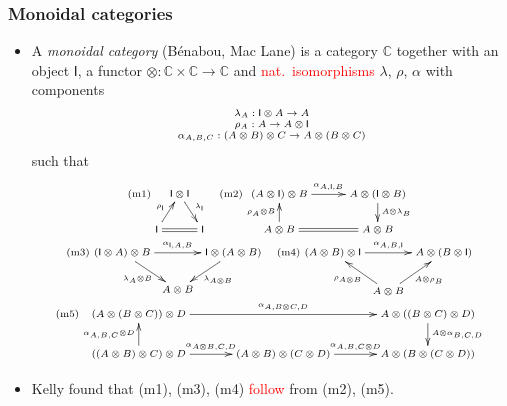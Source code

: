 \documentclass[10pt,t]{beamer}
\newcommand{\red}[1]{\textcolor{red}{#1}}
\newcommand{\I}{\mathsf{I}}
\newcommand{\ot}{\otimes}
\newcommand{\C}{\mathbb{C}}
\newcommand{\al}{\alpha}
\newcommand{\lam}{\lambda}
\begin{document}
\begin{frame}

\frametitle{Monoidal categories}

\begin{itemize}

\item A \emph{monoidal category} (B\'enabou, Mac Lane) is a category $\C$
  together with an object $\I$, a functor $\ot : \C \times \C \to \C$
  and \red{nat.\ isomorphisms} $\lam$, $\rho$, $\al$ with components
\[
\scriptsize
\begin{array}{c}
\lam_{A} : \I \ot A \to A \\
\rho_{A} : A \to A \ot \I\\
\al_{A,B,C} : (A \ot B) \ot C \to A \ot (B \ot C)
\end{array}
\]
such that
\[
\scriptsize
\begin{array}{c}
\mathrm{(m1)}
\xymatrix@R=1.2pc@C=0.2pc{
    & \I \ot \I \ar[dr]^-{\lambda_\I} & \\
    \I \ar[ur]^-{\rho_\I} \ar@{=}[rr] & & \I
    }
\quad
\mathrm{(m2)}
\xymatrix@R=1.1pc{
      (A\ot \I) \ot B \ar[r]^{\alpha_{A,\I,B}}
      & A \ot (\I\ot B) \ar[d]^{A\ot \lambda_{B}}\\
      A \ot B \ar@{=}[r] \ar[u]^{\rho_{A}\ot B}&  A \ot B 
    }
\\
\mathrm{(m3)}
\xymatrix@C=0.2pc@R=1.2pc{
  (\I \ot A) \ot B \ar[dr]_{\lambda_A \ot B} \ar[rr]^{\alpha_{\I,A,B}} 
           & &  \I \ot (A \ot B) \ar[dl]^{\lambda_{A \ot B}}\\
  & A \ot B & 
    }
\quad
\mathrm{(m4)}
\xymatrix@C=0.2pc@R=1.3pc{
  (A \ot B) \ot \I \ar[rr]^{\alpha_{A,B,\I}} 
           & &  A \ot (B \ot \I) \\
  & A \ot B \ar[ul]^{\rho_{A \ot B}} \ar[ur]_{A \ot \rho_B} & 
    }
\\
\mathrm{(m5)}
\xymatrix@R=1.3pc@C=2.5pc{
(A\ot (B \ot C)) \ot D \ar[rr]^{\alpha_{A,B \ot C,D}}
  & & A\ot ((B \ot C)\ot D) \ar[d]^{A\ot \alpha_{B,C,D}}
  \\
((A\ot B) \ot C) \ot D \ar[u]^{\alpha_{A,B,C} \ot D}
      \ar[r]^{\alpha_{A\ot B,C,D}}
  & (A\ot B) \ot (C \ot D) \ar[r]^{\alpha_{A,B,C\ot D}}
    & A\ot (B \ot (C \ot D))
}
\end{array}
\]

\item Kelly found that (m1), (m3), (m4) \red{follow} from (m2), (m5).

\end{itemize}

\end{frame}
\end{document}
